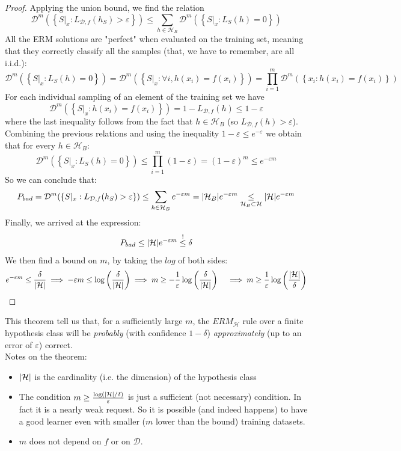 \documentclass[12pt]{report}
\theoremstyle{plain}
\newcommand\mcl[1]{\mathcal{#1}}
\begin{document}
\begin{flushleft}
\begin{proof}
	Applying the union bound, we find the relation
	\[ \mcl{D}^m\left(\left\{ S|_x:L_{\mcl{D},f}(h_S)>\varepsilon \right\}\right)\leq\sum_{h\in\mcl{H}_B}\mcl{D}^m\left(\left\{ S|_x:L_S(h)=0\right\}\right) \]
	All the ERM solutions are "perfect" when evaluated on the training set, meaning that they correctly classify all the samples (that, we have to remember, are all i.i.d.):
	\[ \mcl{D}^m\left(\left\{ S|_x:L_S(h)=0\right\}\right)=\mcl{D}^m\left(\left\{ S|_x:\forall i,h(x_i)=f(x_i)\right\}\right)=\prod_{i=1}^m \mcl{D}^m\left(\left\{ x_i:h(x_i)=f(x_i) \right\}\right) \]
	For each individual sampling of an element of the training set we have
	\[ \mcl{D}^m\left(\left\{ S|_x: h(x_i)=f(x_i)\right\}\right)= 1-L_{\mcl{D},f}(h)\leq 1-\varepsilon \]
	where the last inequality follows from the fact that $h\in\mcl{H}_B$ (so $L_{\mcl{D},f}(h)>\varepsilon$). Combining the previous relations and using the inequality $1-\varepsilon\leq e^{-\varepsilon}$ we obtain that for every $h\in\mcl{H}_B$:
	\[ \mcl{D}^m\left(\left\{ S|_x:L_S(h)=0\right\}\right)\leq\prod_{i=1}^m(1-\varepsilon)=\left(1-\varepsilon\right)^m\leq e^{-\varepsilon m} \]
	So we can conclude that:
	\[ P_{bad}=\mcl{D}^m(\left\{S|_x:L_{\mcl{D},f}(h_S)>\varepsilon\right\})\leq\sum_{h\in\mcl{H}_B}e^{-\varepsilon m}=\abs{\mcl{H}_B}e^{-\varepsilon m}\underset{\mcl{H}_B\subset\mcl{H}}{\leq} \abs{\mcl{H}}e^{-\varepsilon m} \]
	Finally, we arrived at the expression:
	\[ P_{bad} \leq \abs{\mcl{H}}e^{-\varepsilon m}\overset{!}{\leq}\delta \]
	We then find a bound on $m$, by taking the $log$ of both sides:
	\[ e^{-\varepsilon m}\leq\frac{\delta}{\abs{\mcl{H}}} \implies -\varepsilon m\leq\log\left(\frac{\delta}{\abs{\mcl{H}}}\right)\implies m\geq -\frac{1}{\varepsilon}\log\left(\frac{\delta}{\abs{\mcl{H}}}\right) \quad\implies m\geq \frac{1}{\varepsilon}\log\left(\frac{\abs{\mcl{H}}}{\delta}\right)\]
\end{proof} 

This theorem tell us that, for a sufficiently large $m$, the $ERM_\mcl{H}$ rule over a finite hypothesis class will be \textit{probably} (with confidence $1-\delta$) \textit{approximately} (up to an error of $\varepsilon$) correct.\\
Notes on the theorem:
\begin{itemize}
\item $\abs{\mcl{H}}$ is the cardinality (i.e. the dimension) of the hypothesis class
\item The condition $m\geq\frac{\log (\abs{\mcl{H}}/\delta)}{\varepsilon}$ is just a sufficient (not necessary) condition. In fact it is a nearly weak request. So it is possible (and indeed happens) to have a good learner even with smaller ($m$ lower than the bound) training datasets.
\item $m$ does not depend on $f$ or on $\mcl{D}$.
\end{itemize}


\end{flushleft}
\end{document}
